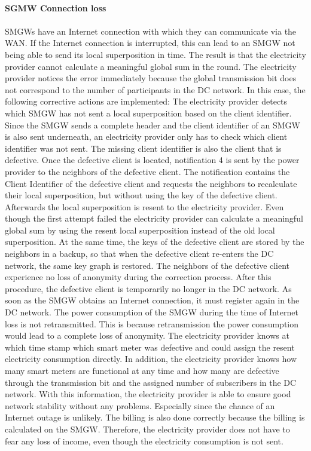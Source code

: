 \\ 
\textbf{SGMW Connection loss}
\\
\\
SMGWs have an Internet connection with which they can communicate via the WAN. If the Internet connection is interrupted, this can lead to an SMGW not being able to send its local superposition in time. The result is that the electricity provider cannot calculate a meaningful global sum in the round. The electricity provider notices the error immediately because the global transmission bit does not correspond to the number of participants in the DC network. In this case, the following corrective actions are implemented: %
The electricity provider detects which SMGW has not sent a local superposition based on the client identifier. Since the SMGW sends a complete header and the client identifier of an SMGW is also sent underneath, an electricity provider only has to check which client identifier was not sent. The missing client identifier is also the client that is defective. Once the defective client is located, notification 4 is sent by the power provider to the neighbors of the defective client. The notification contains the Client Identifier of the defective client and requests the neighbors to recalculate their local superposition, but without using the key of the defective client. Afterwards the local superposition is  resent to the electricity provider. Even though the first attempt failed the electricity provider can calculate a meaningful global sum by using the resent local superposition instead of the old local superposition. At the same time, the keys of the defective client are stored by the neighbors in a backup, so that when the defective client re-enters the DC network, the same key graph is restored. The neighbors of the defective client experience no loss of anonymity during the correction process.%
After this procedure, the defective client is temporarily no longer in the DC network. As soon as the SMGW obtains an Internet connection, it must register again in the DC network. The power consumption of the SMGW during the time of Internet loss is not retransmitted. This is because retransmission the power consumption would lead to a complete loss of anonymity. The electricity provider knows at which time stamp which smart meter was defective and could assign the resent electricity consumption directly. In addition, the electricity provider knows how many smart meters are functional at any time and how many are defective through the transmission bit and the assigned number of subscribers in the DC network. With this information, the electricity provider is able to ensure good network stability without any problems. Especially since the chance of an Internet outage is unlikely. The billing is also done correctly because the billing is calculated on the SMGW. Therefore, the electricity provider does not have to fear any loss of income, even though the electricity consumption is not sent.\\
